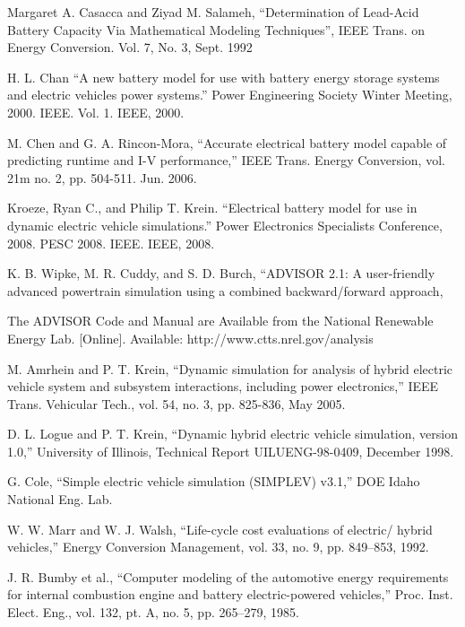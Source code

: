 Margaret A. Casacca and Ziyad M. Salameh,
``Determination of Lead-Acid Battery Capacity
Via Mathematical Modeling Techniques'', IEEE
Trans. on Energy Conversion. Vol. 7, No. 3, Sept.
1992

H. L. Chan ``A new battery model for use with battery energy storage systems and electric vehicles power systems.'' Power Engineering Society Winter Meeting, 2000. IEEE. Vol. 1. IEEE, 2000.



M. Chen and G. A. Rincon-Mora, ``Accurate electrical battery model
capable of predicting runtime and I-V performance,'' IEEE Trans.
Energy Conversion, vol. 21m no. 2, pp. 504-511. Jun. 2006.

Kroeze, Ryan C., and Philip T. Krein. ``Electrical battery model for use in dynamic electric vehicle simulations.'' Power Electronics Specialists Conference, 2008. PESC 2008. IEEE. IEEE, 2008.


K. B. Wipke, M. R. Cuddy, and S. D. Burch, ``ADVISOR 2.1: A
user-friendly advanced powertrain simulation using a combined backward/forward
approach,

The ADVISOR Code and Manual are Available from the National Renewable
Energy Lab. [Online]. Available: http://www.ctts.nrel.gov/analysis

M. Amrhein and P. T. Krein, ``Dynamic simulation for analysis of
hybrid electric vehicle system and subsystem interactions, including
power electronics,'' IEEE Trans. Vehicular Tech., vol. 54, no. 3, pp.
825-836, May 2005.

D. L. Logue and P. T. Krein, ``Dynamic hybrid electric vehicle
simulation, version 1.0,'' University of Illinois, Technical Report
UILUENG-98-0409, December 1998.

G. Cole, ``Simple electric vehicle simulation (SIMPLEV) v3.1,'' DOE
Idaho National Eng. Lab.

W. W. Marr and W. J. Walsh, ``Life-cycle cost evaluations of electric/
hybrid vehicles,'' Energy Conversion Management, vol. 33, no. 9,
pp. 849–853, 1992.

J. R. Bumby et al., ``Computer modeling of the automotive energy requirements
for internal combustion engine and battery electric-powered
vehicles,'' Proc. Inst. Elect. Eng., vol. 132, pt. A, no. 5, pp. 265–279,
1985.

